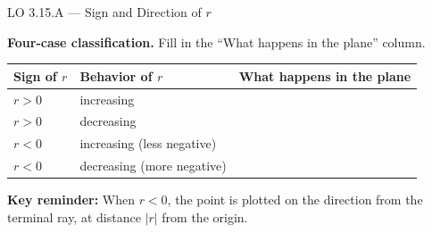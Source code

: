 \documentclass[10pt]{article}
\begin{document}
\vspace{0.08in}

\begin{notesbox}{LO 3.15.A --- Sign and Direction of $r$}

\textbf{Four-case classification.} Fill in the ``What happens in the plane'' column.

\vspace{6pt}
\renewcommand{\arraystretch}{1.7}
\begin{tabular}{|l|l|p{4.5cm}|}
\hline
\textbf{Sign of $r$} & \textbf{Behavior of $r$} & \textbf{What happens in the plane} \\
\hline
$r > 0$ & increasing & \underline{\hspace{4cm}} \\
\hline
$r > 0$ & decreasing & \underline{\hspace{4cm}} \\
\hline
$r < 0$ & increasing (less negative) & \underline{\hspace{4cm}} \\
\hline
$r < 0$ & decreasing (more negative) & \underline{\hspace{4cm}} \\
\hline
\end{tabular}

\vspace{8pt}
\textbf{Key reminder:} When $r < 0$, the point is plotted on the
\underline{\hspace{3.5cm}} direction from the terminal ray, at distance
$|r|$ from the origin.

\end{notesbox}

\vspace{0.08in}
\end{document}
